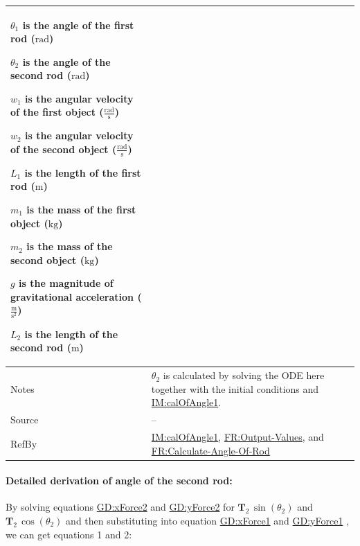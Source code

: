 \documentclass[12pt]{article}
\begin{document}
\begin{minipage}{\textwidth}
\begin{tabular}{>{\raggedright}p{}>{\raggedright\arraybackslash}p{}}
\begin{symbDescription}
              \item{${θ_{1}}$ is the angle of the first rod (${\text{rad}}$)}
              \item{${θ_{2}}$ is the angle of the second rod (${\text{rad}}$)}
              \item{${w_{1}}$ is the angular velocity of the first object ($\frac{\text{rad}}{\text{s}}$)}
              \item{${w_{2}}$ is the angular velocity of the second object ($\frac{\text{rad}}{\text{s}}$)}
              \item{${L_{1}}$ is the length of the first rod (${\text{m}}$)}
              \item{${m_{1}}$ is the mass of the first object (${\text{kg}}$)}
              \item{${m_{2}}$ is the mass of the second object (${\text{kg}}$)}
              \item{$g$ is the magnitude of gravitational acceleration ($\frac{\text{m}}{\text{s}^{2}}$)}
              \item{${L_{2}}$ is the length of the second rod (${\text{m}}$)}
              \end{symbDescription}
\\ \midrule
Notes & ${θ_{2}}$ is calculated by solving the ODE here together with the initial conditions and \hyperref[IM:calOfAngle1]{IM:calOfAngle1}.
        
\\ \midrule
Source & --
         
\\ \midrule
RefBy & \hyperref[IM:calOfAngle1]{IM:calOfAngle1}, \hyperref[outputValues]{FR:Output-Values}, and \hyperref[calcAng]{FR:Calculate-Angle-Of-Rod}
        
\\ \bottomrule
\end{tabular}
\end{minipage}

\paragraph{Detailed derivation of angle of the second rod:}
\label{IM:calOfAngle2Deriv}
By solving equations \hyperref[GD:xForce2]{GD:xForce2} and \hyperref[GD:yForce2]{GD:yForce2} for ${\symbf{T}_{2}}\,\sin\left({θ_{2}}\right)$ and ${\symbf{T}_{2}}\,\cos\left({θ_{2}}\right)$ and then substituting into equation \hyperref[GD:xForce1]{GD:xForce1} and \hyperref[GD:yForce1]{GD:yForce1} , we can get equations 1 and 2:
\end{document}
